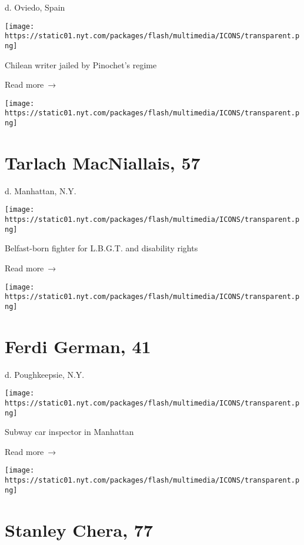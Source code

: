 d. Oviedo, Spain

\texttt{[image: https://static01.nyt.com/packages/flash/multimedia/ICONS/transparent.png]}

Chilean writer jailed by Pinochet's regime

 Read more~→

\href{https://www.nytimes.com/2020/04/17/obituaries/tarlach-macniallais-dead-coronavirus.html}{}

\texttt{[image: https://static01.nyt.com/packages/flash/multimedia/ICONS/transparent.png]}

\hypertarget{tarlach-macniallais-57}{%
\section{Tarlach MacNiallais, 57}\label{tarlach-macniallais-57}}

d. Manhattan, N.Y.

\texttt{[image: https://static01.nyt.com/packages/flash/multimedia/ICONS/transparent.png]}

Belfast-born fighter for L.B.G.T. and disability rights

 Read more~→

\href{https://www.nytimes.com/2020/04/17/obituaries/ferdi-german-dead-coronavirus.html}{}

\texttt{[image: https://static01.nyt.com/packages/flash/multimedia/ICONS/transparent.png]}

\hypertarget{ferdi-german-41}{%
\section{Ferdi German, 41}\label{ferdi-german-41}}

d. Poughkeepsie, N.Y.

\texttt{[image: https://static01.nyt.com/packages/flash/multimedia/ICONS/transparent.png]}

Subway car inspector in Manhattan

 Read more~→

\href{https://www.nytimes.com/2020/04/17/us/stanley-chera-dead-coronavirus.html}{}

\texttt{[image: https://static01.nyt.com/packages/flash/multimedia/ICONS/transparent.png]}

\hypertarget{stanley-chera-77}{%
\section{Stanley Chera, 77}\label{stanley-chera-77}}

